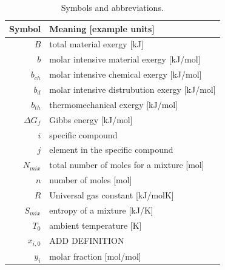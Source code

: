 \documentclass[energies,article,submit,pdftex,moreauthors]{Definitions/mdpi}
\begin{document}

\begin{table}
\footnotesize
\centering %
\caption{Symbols and abbreviations.}
\begin{tabular}{r l}
\toprule
\textbf{Symbol}              & \textbf{Meaning [example units]} \\
\midrule
$B$                 & total material exergy [kJ] \\
$b$                 & molar intensive material exergy [kJ/mol] \\
$b_{ch}$            & molar intensive chemical exergy [kJ/mol] \\
$b_d$               & molar intensive distrubution exergy [kJ/mol] \\
$b_{th}$            & thermomechanical exergy [kJ/mol] \\
$\Delta{G_{f}}$     & Gibbs energy [kJ/mol] \\
$i$                 & specific compound \\
$j$                 & element in the specific compound \\
$N_{mix}$           & total number of moles for a mixture [mol] \\
$n$                 & number of moles [mol] \\
$R$                 & Universal gas constant [kJ/molK] \\
$S_{mix}$           & entropy of a mixture [kJ/K] \\
$T_{0}$             & ambient temperature [K] \\
$x_{i,0}$           & ADD DEFINITION \\
$y_i$               & molar fraction [mol/mol] \\

\bottomrule
\end{tabular}
\label{tab:symbols}
\end{table}



\end{document}
